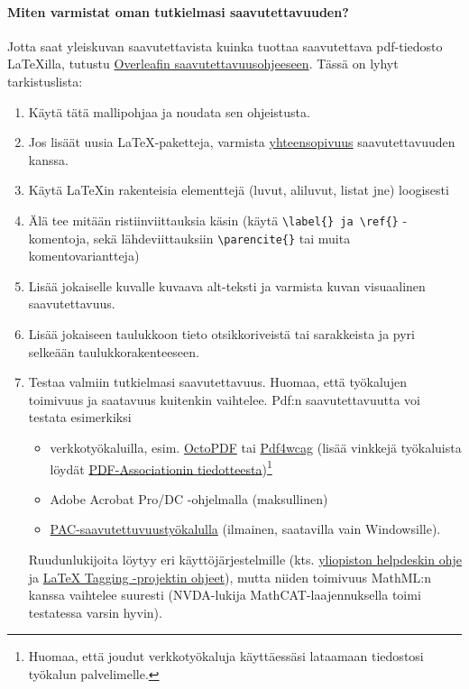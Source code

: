 \documentclass[finnish, manual, a4paper]{csthesis}
\begin{document}
\paragraph{Miten varmistat oman tutkielmasi saavutettavuuden?}

Jotta saat yleiskuvan saavutettavista kuinka tuottaa saavutettava pdf-tiedosto LaTeXilla,
tutustu \href{https://docs.overleaf.com/writing-and-editing/creating-accessible-pdfs}{Overleafin saavu\-tet\-tavuusohjeeseen}. Tässä on lyhyt tarkistuslista:
 
\begin{enumerate}
    \item Käytä tätä mallipohjaa ja noudata sen ohjeistusta. 
    \item Jos lisäät uusia \LaTeX-paketteja, varmista \href{https://latex3.github.io/tagging-project/tagging-status/}{yhteensopivuus} saavutettavuuden kanssa.
    \item Käytä \LaTeX{}in rakenteisia elementtejä (luvut, aliluvut, listat jne) loogisesti 
    \item Älä tee mitään ristiinviittauksia käsin (käytä \texttt{\textbackslash label\{\} ja \texttt{\textbackslash ref\{\}}} -komentoja, sekä lähdeviittauksiin \texttt{\textbackslash parencite\{\}} tai muita komentovariantteja)
    \item Lisää jokaiselle kuvalle kuvaava alt-teksti ja varmista kuvan visuaalinen saavutettavuus. 
    \item Lisää jokaiseen taulukkoon tieto otsikkoriveistä tai sarakkeista ja pyri selkeään taulukkorakenteeseen.
    \item Testaa valmiin tutkielmasi saavutettavuus. Huomaa, että työkalujen toimivuus ja saatavuus kuitenkin vaihtelee. Pdf:n saavutettavuutta voi testata esimerkiksi
    \begin{itemize}
        \item verkkotyökaluilla, esim. \href{https://octopdf.com}{OctoPDF} tai \href{https://pdf4wcag.com}{Pdf4wcag} (lisää vinkkejä työkaluista löydät \href{https://pdfa.org/accessible-math-in-pdf-finally/}{PDF-Associationin tiedotteesta})\footnote{Huomaa, että joudut verkkotyökaluja käyttäessäsi lataamaan tiedostosi työkalun palvelimelle.}
        \item Adobe Acrobat Pro/DC -ohjelmalla (maksullinen)
        \item \href{https://pac.pdf-accessibility.org/en}{PAC-saavutettuvuustyökalulla} (ilmainen, saatavilla vain Windowsille).
    \end{itemize}
    Ruudunlukijoita löytyy eri käyttöjärjestelmille (kts. \href{https://helpdesk.it.helsinki.fi/help/20057}{yliopiston helpdeskin ohje} ja \href{https://latex3.github.io/tagging-project/documentation/wtpdf/fulldoc}{LaTeX Tagging -projektin ohjeet}), mutta niiden toimivuus MathML:n kanssa vaihtelee suuresti (NVDA-lukija MathCAT-laajennuksella toimi testatessa varsin hyvin). \end{enumerate}


\printbibliography[heading=bibintoc,title=\mybibname]%
\label{last_bib_page}

\end{document}
